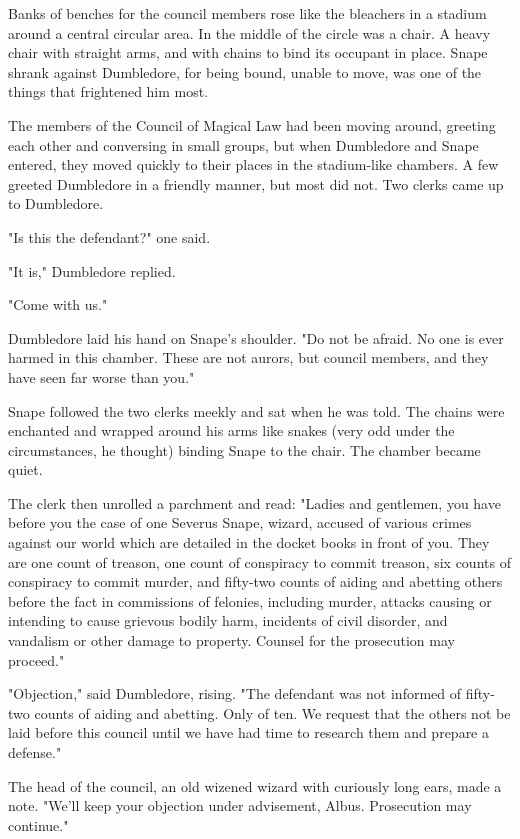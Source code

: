 \documentclass[a4paper,11pt]{article}
\begin{document}
Banks of benches for the council members rose like the bleachers in a stadium around a central circular area. In the middle of the circle was a chair. A heavy chair with straight arms, and with chains to bind its occupant in place. Snape shrank against Dumbledore, for being bound, unable to move, was one of the things that frightened him most.

The members of the Council of Magical Law had been moving around, greeting each other and conversing in small groups, but when Dumbledore and Snape entered, they moved quickly to their places in the stadium-like chambers. A few greeted Dumbledore in a friendly manner, but most did not. Two clerks came up to Dumbledore.

"Is this the defendant?" one said.

"It is," Dumbledore replied.

"Come with us."

Dumbledore laid his hand on Snape's shoulder. "Do not be afraid. No one is ever harmed in this chamber. These are not aurors, but council members, and they have seen far worse than you."

Snape followed the two clerks meekly and sat when he was told. The chains were enchanted and wrapped around his arms like snakes (very odd under the circumstances, he thought) binding Snape to the chair. The chamber became quiet.

The clerk then unrolled a parchment and read: "Ladies and gentlemen, you have before you the case of one Severus Snape, wizard, accused of various crimes against our world which are detailed in the docket books in front of you. They are one count of treason, one count of conspiracy to commit treason, six counts of conspiracy to commit murder, and fifty-two counts of aiding and abetting others before the fact in commissions of felonies, including murder, attacks causing or intending to cause grievous bodily harm, incidents of civil disorder, and vandalism or other damage to property. Counsel for the prosecution may proceed."

"Objection," said Dumbledore, rising. "The defendant was not informed of fifty-two counts of aiding and abetting. Only of ten. We request that the others not be laid before this council until we have had time to research them and prepare a defense."

The head of the council, an old wizened wizard with curiously long ears, made a note. "We'll keep your objection under advisement, Albus. Prosecution may continue."
\end{document}
